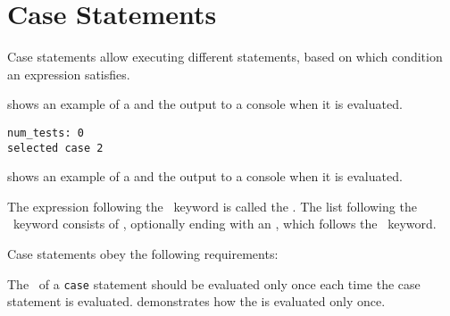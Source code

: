 \FormallyParagraph
\begin{mathpar}
\end{mathpar}

\hypertarget{def-casestatementterm}{}
\section{Case Statements\label{sec:CaseStatements}}
Case statements allow executing different statements, based on which
condition an expression satisfies.

 shows an example of a \casestatementterm{}
and the output to a console when it is evaluated.

\begin{Verbatim}[fontsize=\footnotesize, frame=single]
num_tests: 0
selected case 2
\end{Verbatim}
 shows an example of a \casestatementterm{}
and the output to a console when it is evaluated.

\hypertarget{def-casediscriminantterm}{}
\hypertarget{def-casealternativeterm}{}
\hypertarget{def-otherwisecaseterm}{}
The expression following the \Tcase\ keyword is called the \emph{\casediscriminantterm}.
The list following the \Tof\ keyword consists of \emph{\casealternativesterm},
optionally ending with an \emph{\otherwisecaseterm}, which follows the \Totherwise\ keyword.

Case statements obey the following requirements:

 The \casediscriminantterm\ of a \texttt{case}
statement should be evaluated only once each time the case statement is evaluated.
%
 demonstrates how the \casediscriminantterm{}
is evaluated only once.

